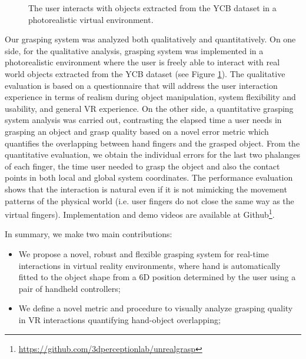 \begin{figure}[!t]
{		\label{subfig:resampling_vector}}
	\caption{The user interacts with objects extracted from the YCB dataset in a photorealistic virtual environment.}
	\label{fig:interaction}
\end{figure}

Our grasping system was analyzed both qualitatively and quantitatively. On one side, for the qualitative analysis, grasping system was implemented in a photorealistic environment where the user is freely able to interact with real world objects extracted from the YCB dataset \cite{calli2015} (see Figure \ref{fig:interaction}). The qualitative evaluation is based on a questionnaire that will address the user interaction experience in terms of realism during object manipulation, system flexibility and usability, and general VR experience. On the other side, a quantitative grasping system analysis was carried out, contrasting the elapsed time a user needs in grasping an object and grasp quality based on a novel error metric which quantifies the overlapping between hand fingers and the grasped object. From the quantitative evaluation, we obtain the individual errors for the last two phalanges of each finger, the time user needed to grasp the object and also the contact points in both local and global system coordinates. The performance evaluation shows that the interaction is natural even if it is not mimicking the movement patterns of the physical world (i.e. user fingers do not close the same way as the virtual fingers). Implementation and demo videos are available at Github\footnote{\href{https://github.com/3dperceptionlab/unrealgrasp}{https://github.com/3dperceptionlab/unrealgrasp}}.

In summary, we make two main contributions:
\begin{itemize}
	\item We propose a novel, robust and flexible grasping system for real-time interactions in virtual reality environments, where hand is automatically fitted to the object shape from a 6D position determined by the user using a pair of handheld controllers;
	\item We define a novel metric and procedure to visually analyze grasping quality in VR interactions quantifying hand-object overlapping; 
\end{itemize}

